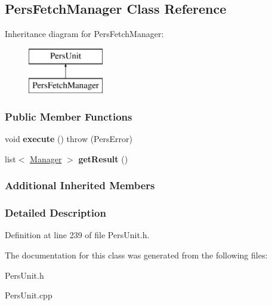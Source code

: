 \hypertarget{classPersFetchManager}{\subsection{Pers\-Fetch\-Manager Class Reference}
\label{d7/de3/classPersFetchManager}
}
Inheritance diagram for Pers\-Fetch\-Manager\-:\begin{figure}[H]
\begin{center}
\leavevmode
\includegraphics[height=2.000000cm]{d7/de3/classPersFetchManager}
\end{center}
\end{figure}
\subsubsection*{Public Member Functions}
\begin{DoxyCompactItemize}
\item 
\hypertarget{classPersFetchManager_aca78de204167406eb461f932e05d6920}{void {\bfseries execute} ()  throw (\-Pers\-Error)}\label{d7/de3/classPersFetchManager_aca78de204167406eb461f932e05d6920}

\item 
\hypertarget{classPersFetchManager_a65661cbba59586d6b88c36dd38995de7}{list$<$ \hyperlink{classManager}{Manager} $>$ {\bfseries get\-Result} ()}\label{d7/de3/classPersFetchManager_a65661cbba59586d6b88c36dd38995de7}

\end{DoxyCompactItemize}
\subsubsection*{Additional Inherited Members}


\subsubsection{Detailed Description}


Definition at line 239 of file Pers\-Unit.\-h.



The documentation for this class was generated from the following files\-:\begin{DoxyCompactItemize}
\item 
Pers\-Unit.\-h\item 
Pers\-Unit.\-cpp\end{DoxyCompactItemize}
